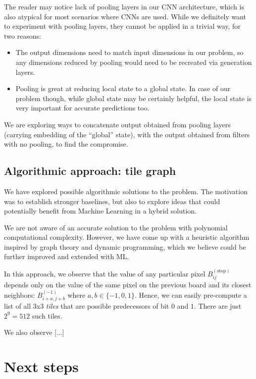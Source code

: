 \documentclass[conference]{IEEEtran}
\begin{document}
The reader may notice lack of pooling layers in our CNN architecture, which is also atypical for most scenarios where CNNs are used. While we definitely want to experiment with pooling layers, they cannot be applied in a trivial way, for two reasons:
\begin{itemize}
    \item The output dimensions need to match input dimensions in our problem, so any dimensions reduced by pooling would need to be recreated via generation layers.

    \item Pooling is great at reducing local state to a global state. In case of our problem though, while global state may be certainly helpful, the local state is very important for accurate predictions too.
\end{itemize}

We are exploring ways to concatenate output obtained from pooling layers (carrying embedding of the ``global'' state), with the output obtained from filters with no pooling, to find the compromise.

\subsection{Algorithmic approach: tile graph}
We have explored possible algorithmic solutions to the problem. The motivation was to establish stronger baselines, but also to explore ideas that could potentially benefit from Machine Learning in a hybrid solution.

We are not aware of an accurate solution to the problem with polynomial computational complexity. However, we have come up with a heuristic algorithm inspired by graph theory and dynamic programming, which we believe could be further improved and extended with ML.

In this approach, we observe that the value of any particular pixel $B^{(\text{stop})}_{ij}$ depends only on the value of the same pixel on the previous board and its closest neighbors: $B^{(-1)}_{i+a,j+b}$ where $a, b \in \{-1, 0, 1\}$. Hence, we can easily pre-compute a list of all 3x3 {\it tiles} that are possible predecessors of bit $0$ and $1$. There are just $2^9=512$ such tiles.

We also observe [...]

\section{Next steps}
\end{document}

